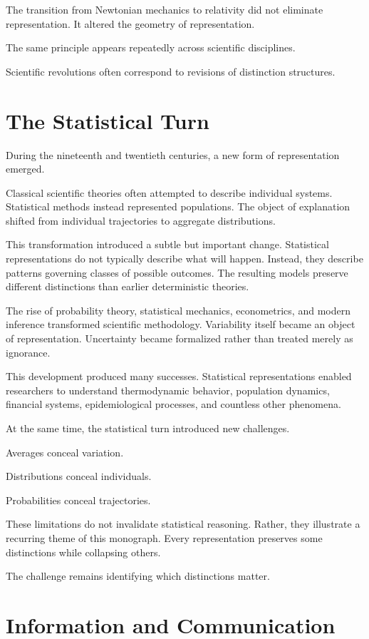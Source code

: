 \documentclass[11pt,oneside,openany]{book}
\begin{document}
The transition from Newtonian mechanics to relativity did not eliminate representation. It altered the geometry of representation.

The same principle appears repeatedly across scientific disciplines.

Scientific revolutions often correspond to revisions of distinction structures.

\section{The Statistical Turn}

During the nineteenth and twentieth centuries, a new form of representation emerged.

Classical scientific theories often attempted to describe individual systems. Statistical methods instead represented populations. The object of explanation shifted from individual trajectories to aggregate distributions.

This transformation introduced a subtle but important change. Statistical representations do not typically describe what will happen. Instead, they describe patterns governing classes of possible outcomes. The resulting models preserve different distinctions than earlier deterministic theories.

The rise of probability theory, statistical mechanics, econometrics, and modern inference transformed scientific methodology. Variability itself became an object of representation. Uncertainty became formalized rather than treated merely as ignorance.

This development produced many successes. Statistical representations enabled researchers to understand thermodynamic behavior, population dynamics, financial systems, epidemiological processes, and countless other phenomena.

At the same time, the statistical turn introduced new challenges.

Averages conceal variation.

Distributions conceal individuals.

Probabilities conceal trajectories.

These limitations do not invalidate statistical reasoning. Rather, they illustrate a recurring theme of this monograph. Every representation preserves some distinctions while collapsing others.

The challenge remains identifying which distinctions matter.

\section{Information and Communication}
\end{document}
